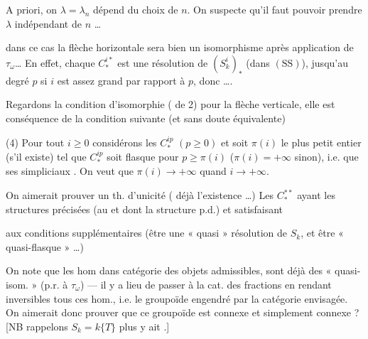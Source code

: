 \documentclass[11pt,a4paper]{article}
\begin{document}
A priori, on $\lambda = \lambda_n$ dépend du choix de $n$. On suspecte qu'il faut pouvoir prendre $\lambda$ indépendant de $n$ …

dans ce cas la flèche horizontale sera bien un isomorphisme  après application de $\tau_{\omega}$… En effet, chaque $C^{i*}_{*}$ est une résolution de $(S^{i}_{k})_{*}$ (dans $(\mathrm{SS})$), jusqu'au degré $p$ si $i$ est assez grand par rapport à $p$, donc ….

 Regardons la condition d'isomorphie ( de 2) pour la flèche verticale, elle  est conséquence de la condition suivante (et sans doute équivalente)

(4) Pour tout $i \geqslant 0$ considérons les $C^{ip}_{*}$  $(p \geqslant 0)$ et soit $\pi(i)$ le plus petit entier (s'il existe) tel que $C^{ip}_{*}$ soit flasque pour $p \geqslant \pi(i)$ ($\pi(i) = +\infty$ sinon), \struck{\ill{}}  i.e. que ses  \ill{} simpliciaux  \ill{}. On veut que $\pi(i) \to +\infty$ quand $i \to +\infty$.


On aimerait prouver un th. d'unicité (\ill{} déjà l'existence …) Les $C^{**}_{*}$ ayant les structures précisées (au  \ill{} et dont la structure p.d.) et satisfaisant

aux conditions supplémentaires    (être une « quasi » résolution de $S_k$, et être « quasi-flasque » …)

On note que les hom dans \struck{\ill{}}  catégorie des objets  admissibles, sont déjà des « quasi-isom. » (p.r. à $\tau_{\omega}$) — il y a lieu de passer à la cat. des fractions en  rendant inversibles tous ces hom., i.e. le groupoïde engendré par la catégorie envisagée. On aimerait donc prouver que ce groupoïde est connexe et simplement connexe ? [NB rappelons \ill{} \add{\ill{}} $S_k = k\{T\}$ \ill{} \ill{} \ill{} plus   y ait \ill{} \ill{} .]
\note{le crochet ouvert par « [NB » se ferme après une ligne et demie d'insertions serrées, dont l'ordre est incertain.}
\end{document}
